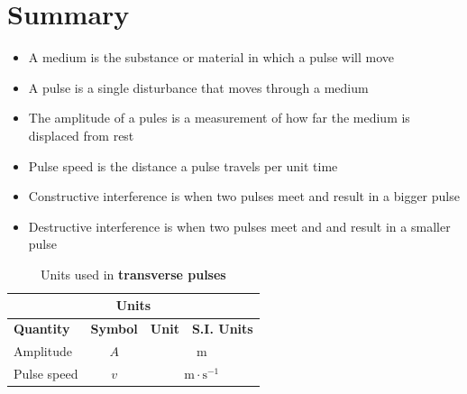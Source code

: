             \section{Summary}
            \nopagebreak
            \label{m38802*eip-404}\begin{itemize}[noitemsep]
            \item A medium is the substance or material in which a pulse will move
	    \item A pulse is a single disturbance that moves through a medium
	    \item The amplitude of a pules is a measurement of how far the medium is displaced from rest
	    \item Pulse speed is the distance a pulse travels per unit time
	    \item Constructive interference is when two pulses meet and result in a bigger pulse		
	    \item Destructive interference is when two pulses meet and and result in a smaller pulse
	    \end{itemize}
        \label{m38802*cid9}
\begin{table}[H]
\begin{center}
\begin{tabular}{|l|c|c|c|}\hline \hline 
\multicolumn{4}{|c|}{\textbf{Units}}\\ \hline \hline
\textbf{Quantity} & \textbf{Symbol} & \textbf{Unit} & \textbf{S.I. Units}  \\ \hline
Amplitude & $A$ & \multicolumn{2}{c|}{m} \\ \hline
Pulse speed & $v$ & \multicolumn{2}{c|}{$\text{m} \cdot \text{s}^{-1}$} \\ \hline
\end{tabular}
\end{center}
\caption{Units used in \textbf{transverse pulses} }
\label{table:electricity::units}
\end{table}

